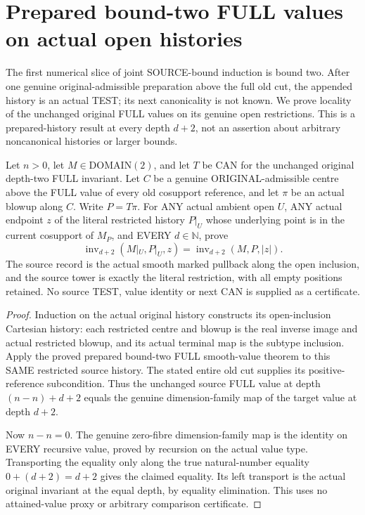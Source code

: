 \section{Prepared bound-two FULL values on actual open histories}

The first numerical slice of joint SOURCE-bound induction is bound two.
After one genuine original-admissible preparation above the full old cut,
the appended history is an actual TEST; its next canonicality is not known.
We prove locality of the unchanged original FULL values on its genuine open
restrictions. This is a prepared-history result at every depth $d+2$,
not an assertion about arbitrary noncanonical histories or larger bounds.

\begin{theorem}
\label{hir:original-prepared-bound-two-open-full-locality}
\leanok
Let $n>0$, let $M\in\mathrm{DOMAIN}(2)$, and let $T$ be CAN for the
unchanged original depth-two FULL invariant. Let $C$ be a genuine
ORIGINAL-admissible centre above the FULL value of every old cosupport
reference, and let $\pi$ be an actual blowup along $C$.
Write $P=T\pi$. For ANY actual ambient open $U$, ANY actual endpoint
$z$ of the literal restricted history $P|_U$ whose underlying point is in
the current cosupport of $M_P$, and EVERY $d\in\mathbb N$, prove
\[
 \operatorname{inv}_{d+2}(M|_U,P|_U,z)
   =\operatorname{inv}_{d+2}(M,P,|z|).
\]
The source record is the actual smooth marked pullback along the open
inclusion, and the source tower is exactly the literal restriction, with
all empty positions retained. No source TEST, value identity or next CAN
is supplied as a certificate.
\end{theorem}
\begin{proof}
Induction on the actual original history constructs its open-inclusion
Cartesian history: each restricted centre and blowup is the real inverse
image and actual restricted blowup, and its actual terminal map is the
subtype inclusion. Apply the proved prepared bound-two FULL smooth-value
theorem to this SAME restricted source history. The stated entire old
cut supplies its positive-reference subcondition. Thus the unchanged
source FULL value at depth $(n-n)+d+2$ equals the genuine dimension-family
map of the target value at depth $d+2$.

Now $n-n=0$. The genuine zero-fibre dimension-family map is the identity
on EVERY recursive value, proved by recursion on the actual value type.
Transporting the equality only along the true natural-number equality
$0+(d+2)=d+2$ gives the claimed equality. Its left transport is the
actual original invariant at the equal depth, by equality elimination.
This uses no attained-value proxy or arbitrary comparison certificate.
\end{proof}

